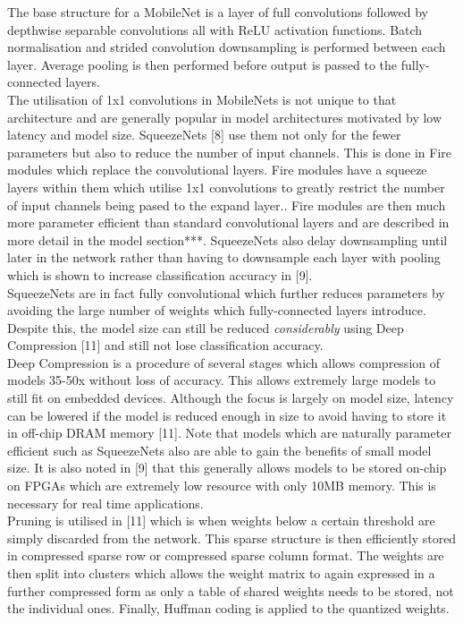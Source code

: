 \documentclass{article}
\begin{document}
The base structure for a MobileNet is a layer of full convolutions followed by depthwise separable convolutions all with ReLU activation functions. Batch normalisation and strided convolution downsampling is performed between each layer. Average pooling is then performed before output is passed to the fully-connected layers.\\

The utilisation of 1x1 convolutions in MobileNets is not unique to that architecture and are generally popular in model architectures motivated by low latency and model size. SqueezeNets [8] use them not only for the fewer parameters but also to reduce the number of input channels. This is done in Fire modules which replace the convolutional layers. Fire modules have a squeeze layers within them which utilise 1x1 convolutions to greatly restrict the number of input channels being pased to the expand layer.. Fire modules are then much more parameter efficient than standard convolutional layers and are described in more detail in the model section***. SqueezeNets also delay downsampling until later in the network rather than having to downsample each layer with pooling which is shown to increase classification accuracy in [9].\\

SqueezeNets are in fact fully convolutional which further reduces parameters by avoiding the large number of weights which fully-connected layers introduce. Despite this, the model size can still be reduced \emph{considerably} using Deep Compression  [11] and still not lose classification accuracy.\\

Deep Compression is a procedure of several stages which allows compression of models 35-50x without loss of accuracy. This allows extremely large models to still fit on embedded devices. Although the focus is largely on model size, latency can be lowered if the model is reduced enough in size to avoid having to store it in off-chip DRAM memory [11]. Note that models which are naturally parameter efficient such as SqueezeNets also are able to gain the benefits of small model size. It is also noted in [9] that this generally allows models to be stored on-chip on FPGAs which are extremely low resource with only 10MB  memory. This is necessary for real time applications. \\

Pruning is utilised in [11] which is when weights below a certain threshold are simply discarded from the network. This sparse structure is then efficiently stored in compressed sparse row or compressed sparse column format. The weights are then split into clusters which allows the weight matrix to again expressed in a further compressed form as only a table of shared weights needs to be stored, not the individual ones. Finally, Huffman coding is applied to the quantized weights.\\
\end{document}
